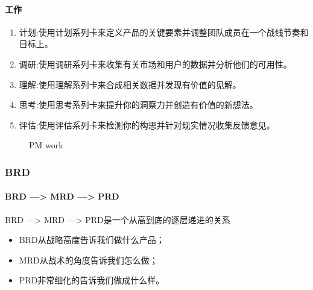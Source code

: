 \documentclass[letterpaper,10pt,english]{sphinxmanual}
\begin{document}
\paragraph{工作}
\label{\detokenize{chapter_knowledge/steps:id4}}\begin{enumerate}
%
\item {} 
计划:使用计划系列卡来定义产品的关键要素并调整团队成员在一个战线节奏和目标上。

\item {} 
调研:使用调研系列卡来收集有关市场和用户的数据并分析他们的可用性。

\item {} 
理解:使用理解系列卡来合成相关数据并发现有价值的见解。

\item {} 
思考:使用思考系列卡来提升你的洞察力并创造有价值的新想法。

\item {} 
评估:使用评估系列卡来检测你的构思并针对现实情况收集反馈意见。%
\begin{footnote}[479]\sphinxAtStartFootnote
{}
%
\end{footnote}

\end{enumerate}

\begin{figure}[H]
\centering
\capstart

\noindent{}
\caption{PM work}\label{\detokenize{chapter_knowledge/steps:id8}}\end{figure}


\subsubsection{BRD}
\label{\detokenize{chapter_knowledge/BRD:brd}}\label{\detokenize{chapter_knowledge/BRD::doc}}

\paragraph{BRD —> MRD —> PRD}
\label{\detokenize{chapter_knowledge/BRD:brd-mrd-prd}}
BRD —> MRD —> PRD是一个从高到底的逐层递进的关系
%
\begin{footnote}[480]\sphinxAtStartFootnote
{}
%
\end{footnote}
\begin{itemize}
\item {} 
BRD从战略高度告诉我们做什么产品；

\item {} 
MRD从战术的角度告诉我们怎么做；

\item {} 
PRD非常细化的告诉我们做成什么样。

\end{itemize}
\end{document}
